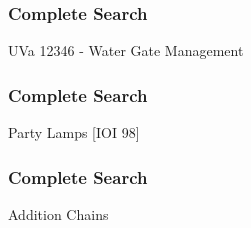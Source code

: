 \begin{frame}
\frametitle{Complete Search}
\begin{block}{UVa 12346 - Water Gate Management}
\end{block}
\end{frame}

\begin{frame}
\frametitle{Complete Search}
\begin{block}{Party Lamps [IOI 98]}
%
%
%
%
\end{block}
\end{frame}

\begin{frame}
\frametitle{Complete Search}
\begin{block}{Addition Chains}
%
\end{block}
\end{frame}


